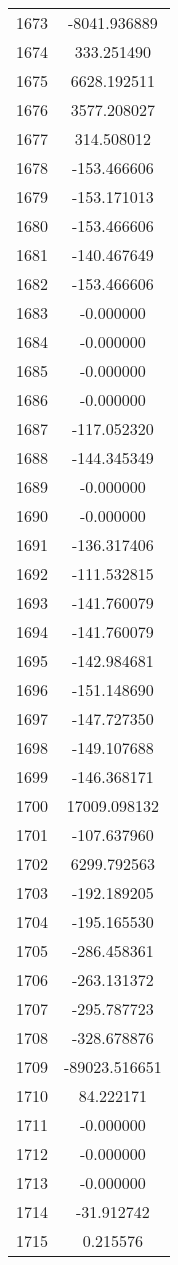 \documentclass[12pt]{article}
\begin{document}
\begin{longtable}{@{}cc@{}}
1673 & -8041.936889 \\
1674 & 333.251490 \\
1675 & 6628.192511 \\
1676 & 3577.208027 \\
1677 & 314.508012 \\
1678 & -153.466606 \\
1679 & -153.171013 \\
1680 & -153.466606 \\
1681 & -140.467649 \\
1682 & -153.466606 \\
1683 & -0.000000 \\
1684 & -0.000000 \\
1685 & -0.000000 \\
1686 & -0.000000 \\
1687 & -117.052320 \\
1688 & -144.345349 \\
1689 & -0.000000 \\
1690 & -0.000000 \\
1691 & -136.317406 \\
1692 & -111.532815 \\
1693 & -141.760079 \\
1694 & -141.760079 \\
1695 & -142.984681 \\
1696 & -151.148690 \\
1697 & -147.727350 \\
1698 & -149.107688 \\
1699 & -146.368171 \\
1700 & 17009.098132 \\
1701 & -107.637960 \\
1702 & 6299.792563 \\
1703 & -192.189205 \\
1704 & -195.165530 \\
1705 & -286.458361 \\
1706 & -263.131372 \\
1707 & -295.787723 \\
1708 & -328.678876 \\
1709 & -89023.516651 \\
1710 & 84.222171 \\
1711 & -0.000000 \\
1712 & -0.000000 \\
1713 & -0.000000 \\
1714 & -31.912742 \\
1715 & 0.215576 \\

\end{longtable}
\end{document}

